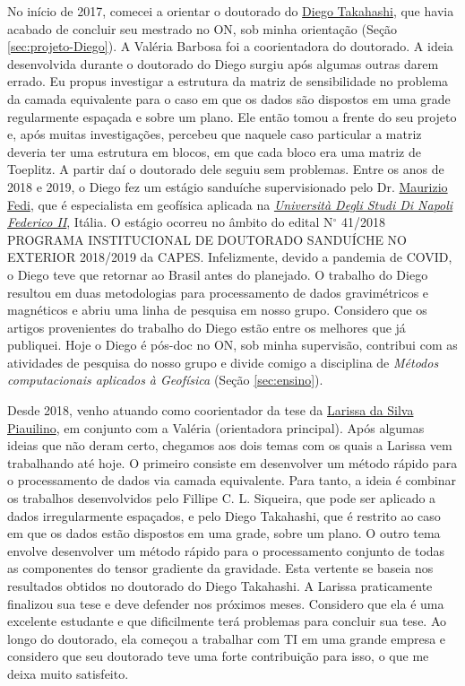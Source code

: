 No início de 2017, comecei a orientar o doutorado do 
\href{https://lattes.cnpq.br/4939493474727725}{Diego Takahashi}, que havia acabado de
concluir seu mestrado no ON, sob minha orientação (Seção \ref{sec:projeto-Diego}).
A Valéria Barbosa foi a coorientadora do doutorado.
A ideia desenvolvida durante o doutorado do Diego surgiu após algumas outras darem
errado. Eu propus investigar a estrutura da matriz de sensibilidade no problema da camada
equivalente para o caso em que os dados são dispostos em uma grade regularmente espaçada
e sobre um plano. Ele então tomou a frente do seu projeto e, após muitas investigações,
percebeu que naquele caso particular a matriz deveria ter uma estrutura em blocos,
em que cada bloco era uma matriz de Toeplitz. A partir daí o doutorado dele seguiu
sem problemas. Entre os anos de 2018 e 2019, o Diego fez um estágio sanduíche supervisionado
pelo Dr. \href{https://www.docenti.unina.it/maurizio.fedi}{Maurizio Fedi}, que é
especialista em geofísica aplicada na 
\href{https://www.unina.it/home}{\textit{Università Degli Studi Di Napoli Federico II}}, 
Itália. O estágio ocorreu no âmbito do edital 
N$^{\circ}$ 41/2018 PROGRAMA INSTITUCIONAL DE DOUTORADO SANDUÍCHE NO EXTERIOR 2018/2019
da CAPES. Infelizmente, devido a pandemia de COVID, o Diego teve que retornar ao Brasil
antes do planejado.
O trabalho do Diego resultou em duas metodologias para processamento de dados gravimétricos 
e magnéticos e abriu uma linha de pesquisa em nosso grupo. Considero que os artigos 
provenientes do trabalho do Diego estão entre os melhores que já publiquei.
Hoje o Diego é pós-doc no ON, 
sob minha supervisão, contribui com as atividades de pesquisa do nosso grupo e divide comigo 
a disciplina de \textit{Métodos computacionais aplicados à Geofísica} 
(Seção \ref{sec:ensino}).

Desde 2018, venho atuando como coorientador da tese da 
\href{https://lattes.cnpq.br/8427378352823905}{Larissa da Silva Piauilino},
em conjunto com a Valéria (orientadora principal). 
Após algumas ideias que não deram certo, chegamos aos dois temas com os quais a Larissa
vem trabalhando até hoje. O primeiro consiste em desenvolver um método rápido para o
processamento de dados via camada 
equivalente. Para tanto, a ideia é combinar os trabalhos desenvolvidos pelo 
Fillipe C. L. Siqueira, que pode ser aplicado a dados irregularmente espaçados, e pelo
Diego Takahashi, que é restrito ao caso em que os dados estão dispostos em uma grade, sobre
um plano. O outro tema envolve desenvolver um método rápido para 
o processamento conjunto de todas as componentes do tensor gradiente da gravidade.
Esta vertente se baseia nos resultados obtidos no doutorado do Diego Takahashi.
A Larissa praticamente finalizou sua tese e deve defender nos próximos meses.
Considero que ela é uma excelente estudante e que dificilmente terá problemas para concluir
sua tese.
Ao longo do doutorado, ela começou a trabalhar com TI em uma grande empresa e considero que
seu doutorado teve uma forte contribuição para isso, o que me deixa muito satisfeito.

